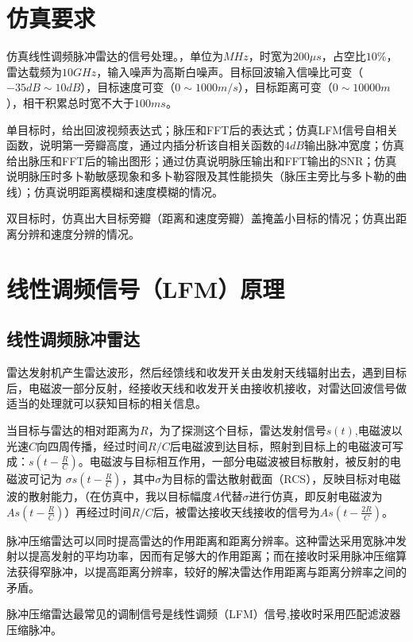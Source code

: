 \documentclass[12pt]{article}
\begin{document}
\section{仿真要求}
\setcounter{page}{1}
\setcounter{table}{0}
\setcounter{figure}{0}
\setcounter{equation}{0}
仿真线性调频脉冲雷达的信号处理。，单位为$MHz$，时宽为$200\mu s$，占空比$10\%$，雷达载频为$10GHz$，输入噪声为高斯白噪声。目标回波输入信噪比可变（$-35dB \sim 10dB$），目标速度可变（$0 \sim 1000m/s$），目标距离可变（$0\sim 10000m$），相干积累总时宽不大于$100ms$。\par 单目标时，给出回波视频表达式；脉压和FFT后的表达式；仿真LFM信号自相关函数，说明第一旁瓣高度，通过内插分析该自相关函数的$4dB$输出脉冲宽度；仿真给出脉压和FFT后的输出图形；通过仿真说明脉压输出和FFT输出的SNR；仿真说明脉压时多卜勒敏感现象和多卜勒容限及其性能损失（脉压主旁比与多卜勒的曲线）；仿真说明距离模糊和速度模糊的情况。\par 双目标时，仿真出大目标旁瓣（距离和速度旁瓣）盖掩盖小目标的情况；仿真出距离分辨和速度分辨的情况。
\section{线性调频信号（LFM）原理}
\setcounter{table}{0}
\setcounter{figure}{0}
\setcounter{equation}{0}
\subsection{线性调频脉冲雷达}
雷达发射机产生雷达波形，然后经馈线和收发开关由发射天线辐射出去，遇到目标后，电磁波一部分反射，经接收天线和收发开关由接收机接收，对雷达回波信号做适当的处理就可以获知目标的相关信息。\par
当目标与雷达的相对距离为$R$，为了探测这个目标，雷达发射信号$s(t)$,电磁波以光速$C$向四周传播，经过时间$R/C$后电磁波到达目标，照射到目标上的电磁波可写成：$s(t-\frac{R}{C})$。电磁波与目标相互作用，一部分电磁波被目标散射，被反射的电磁波可记为
$\sigma s(t-\frac{R}{C})$，其中$\sigma$为目标的雷达散射截面（RCS），反映目标对电磁波的散射能力，（在仿真中，我以目标幅度$A$代替$\sigma$进行仿真，即反射电磁波为$A s(t-\frac{R}{C})$）再经过时间$R/C$后，被雷达接收天线接收的信号为$A s(t-\frac{2R}{C})$。\par
脉冲压缩雷达可以同时提高雷达的作用距离和距离分辨率。这种雷达采用宽脉冲发射以提高发射的平均功率，因而有足够大的作用距离；而在接收时采用脉冲压缩算法获得窄脉冲，以提高距离分辨率，较好的解决雷达作用距离与距离分辨率之间的矛盾。\par
脉冲压缩雷达最常见的调制信号是线性调频（LFM）信号,接收时采用匹配滤波器压缩脉冲。
\end{document}
